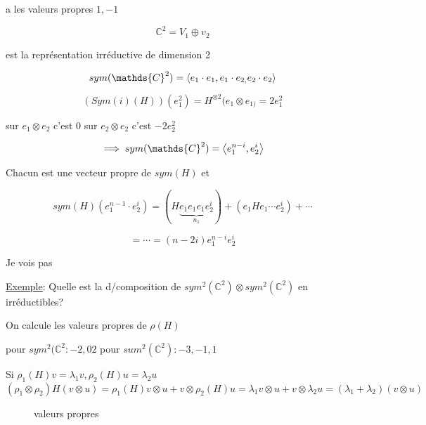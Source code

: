 a les valeurs propres \(1, -1\)


\[ \mathds{C}^2 = V_1 \oplus v_2  \]

est la représentation irréductive de dimension 2

\[ sym(\mathds{C}^2) = \expval{e_1 \cdot e_1, e_1 \cdot e_{2,} e_2 \cdot e_2} \]

\[ \left( Sym(i)(H) \right)(e_1^{2}) = H^{ \otimes 2}(e_1 \otimes e_{1)} = 2 e_1^{2}  \]

sur \(e_1 \otimes e_2\) c'est \(0\)
sur \(e_2 \otimes e_2\) c'est \(-2e_2^{2}\)

\[ \implies sym(\mathds{C}^2) = \expval{e_1^{n-i}, e_2^{i}} \]

Chacun est une vecteur propre de \(sym(H)\) et 

\[ sym(H)(e_1^{n-1} \cdot {e_2^i}) = \left( H \underbrace{e_1 e_1 e_1 e_2^{i}}_{n_1}  \right) + \left( e_1 H e_1 \dotsb e_2^{i} \right)  + \dotsb \]


\[ = \dotsb = (n-2i) e_1^{n-i} e_2^{i} \]

Je vois pas

\underline{Exemple}:
Quelle est la d/composition de \(sym^{2}(\mathds{C}^2) \otimes sym^{2}(\mathds{C}^2)\) en irréductibles?

On calcule les valeurs propres de \(\rho(H)\)

pour \(sym^{2}(\mathds{C}^2: -2, 0 2\)
pour \(sum^{2}(\mathds{C}^2): -3, -1, 1\)

Si \(\rho_1 (H) v = \lambda_1 v, \rho_{2}(H) u = \lambda_2 u\)
\[  \left( \rho_1 \otimes \rho_2  \right) H \left( v \otimes u \right) = \rho_1(H) v \otimes u + v \otimes \rho_2 (H) u = \lambda_1 v \otimes u + v \otimes \lambda_2 u = \left( \lambda_1 + \lambda_2 \right) \left( v \otimes u  \right)  \]

\begin{figure}[ht]
    \centering
    \caption{valeurs propres}
    \label{fig:valeurs-propres}
\end{figure}



